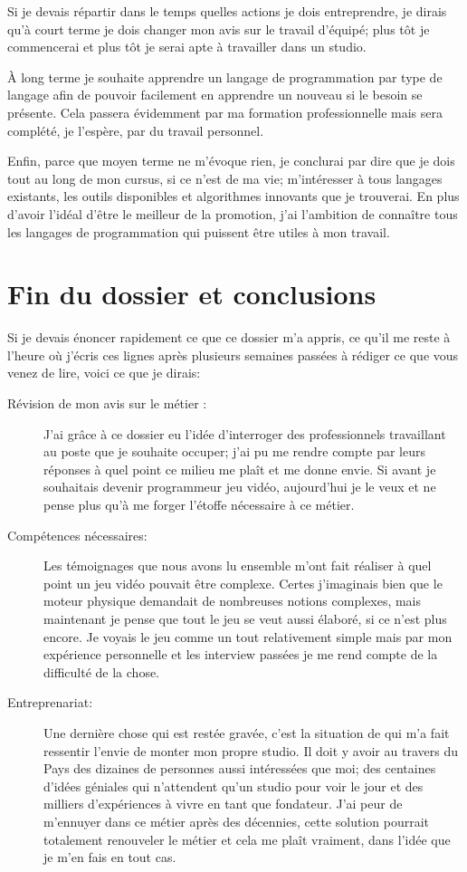 \documentclass[12pt, a4paper]{report} %
\begin{document}
Si je devais répartir dans le temps quelles actions je dois entreprendre, je dirais qu'à court terme je dois changer mon avis sur le travail d'équipé; plus tôt je commencerai et plus tôt je serai apte à travailler dans un studio. 

\`{A} long terme je souhaite apprendre un langage de programmation par type de langage  afin de pouvoir facilement en apprendre un nouveau si le besoin se présente. Cela passera évidemment par ma formation professionnelle mais sera complété, je l'espère, par du travail personnel.

Enfin, parce que \og moyen terme \fg{} ne m'évoque rien, je conclurai par dire que je dois tout au long de mon cursus, si ce n'est de ma vie; m'intéresser à tous langages existants, les outils disponibles et algorithmes innovants que je trouverai. En plus d'avoir l'idéal d'être le meilleur de la promotion, j'ai l'ambition de connaître tous les langages de programmation qui puissent être utiles à mon travail.

\section{Fin du dossier et conclusions}
Si je devais énoncer rapidement ce que ce dossier m'a appris, ce qu'il me reste à l'heure où j'écris ces lignes après plusieurs semaines passées à rédiger ce que vous venez de lire, voici ce que je dirais:
\begin{description}
\item[Révision de mon avis sur le métier :] J'ai grâce à ce dossier eu l'idée d'interroger des professionnels travaillant au poste que je souhaite occuper; j'ai pu me rendre compte par leurs réponses à quel point ce milieu me plaît et me donne envie. Si avant je souhaitais devenir programmeur jeu vidéo, aujourd'hui je le veux et ne pense plus qu'à me forger l'étoffe nécessaire à ce métier.
\item[Compétences nécessaires:] Les témoignages que nous avons lu ensemble m'ont fait réaliser à quel point un jeu vidéo pouvait être complexe. Certes j'imaginais bien que le moteur physique demandait de nombreuses notions complexes, mais maintenant je pense que tout le jeu se veut aussi élaboré, si ce n'est plus encore. Je voyais le jeu comme un tout relativement simple mais par mon expérience personnelle et les interview passées je me rend compte de la difficulté de la chose.
\item[Entreprenariat:] Une dernière chose qui est restée gravée, c'est la situation de \agg{} qui m'a fait ressentir l'envie de monter mon propre studio. Il doit y avoir au travers du Pays des dizaines de personnes aussi intéressées que moi; des centaines d'idées géniales qui n'attendent qu'un studio pour voir le jour et des milliers d'expériences à vivre en tant que fondateur. J'ai peur de m'ennuyer dans ce métier après des décennies, cette solution pourrait totalement renouveler le métier et cela me plaît vraiment, dans l'idée que je m'en fais en tout cas.
\end{description}
\end{document}
